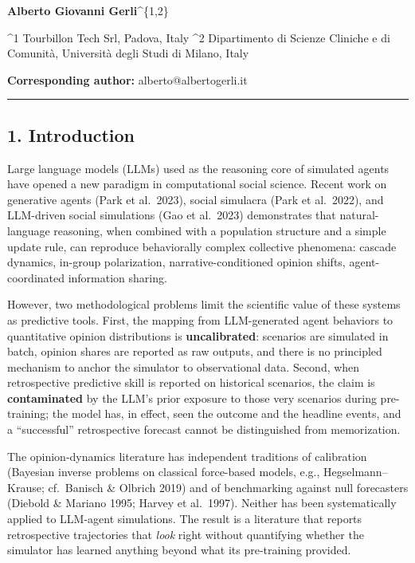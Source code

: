 \documentclass[
]{article}
\begin{document}
\textbf{Alberto Giovanni Gerli}\^{}\{1,2\}

\^{}1 Tourbillon Tech Srl, Padova, Italy \^{}2 Dipartimento di Scienze
Cliniche e di Comunità, Università degli Studi di Milano, Italy

\textbf{Corresponding author:} alberto@albertogerli.it

\begin{center}\rule{0.5\linewidth}{0.5pt}\end{center}

\subsection{1. Introduction}\label{introduction}

Large language models (LLMs) used as the reasoning core of simulated
agents have opened a new paradigm in computational social science.
Recent work on generative agents (Park et al.~2023), social simulacra
(Park et al.~2022), and LLM-driven social simulations (Gao et al.~2023)
demonstrates that natural-language reasoning, when combined with a
population structure and a simple update rule, can reproduce
behaviorally complex collective phenomena: cascade dynamics, in-group
polarization, narrative-conditioned opinion shifts, agent-coordinated
information sharing.

However, two methodological problems limit the scientific value of these
systems as predictive tools. First, the mapping from LLM-generated agent
behaviors to quantitative opinion distributions is
\textbf{uncalibrated}: scenarios are simulated in batch, opinion shares
are reported as raw outputs, and there is no principled mechanism to
anchor the simulator to observational data. Second, when retrospective
predictive skill is reported on historical scenarios, the claim is
\textbf{contaminated} by the LLM's prior exposure to those very
scenarios during pre-training; the model has, in effect, seen the
outcome and the headline events, and a ``successful'' retrospective
forecast cannot be distinguished from memorization.

The opinion-dynamics literature has independent traditions of
calibration (Bayesian inverse problems on classical force-based models,
e.g., Hegselmann--Krause; cf.~Banisch \& Olbrich 2019) and of
benchmarking against null forecasters (Diebold \& Mariano 1995; Harvey
et al.~1997). Neither has been systematically applied to LLM-agent
simulations. The result is a literature that reports retrospective
trajectories that \emph{look} right without quantifying whether the
simulator has learned anything beyond what its pre-training provided.
\end{document}
